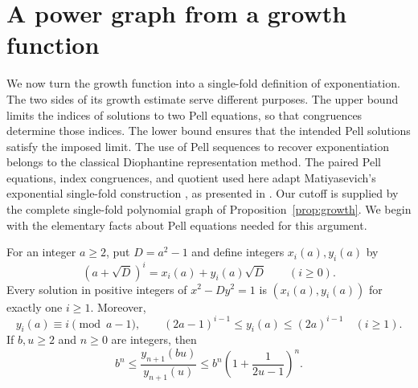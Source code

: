 \section{A power graph from a growth function}\label{sec:power}

We now turn the growth function into a single-fold definition of
exponentiation.  The two sides of its growth estimate serve different
purposes.  The upper bound limits the indices of solutions to two Pell
equations, so that congruences determine those indices.  The lower bound
ensures that the intended Pell solutions satisfy the imposed limit.
The use of Pell sequences to recover exponentiation belongs to the
classical Diophantine representation method.  The paired Pell equations,
index congruences, and quotient used here adapt Matiyasevich's exponential
single-fold construction \cite[Section~4]{mati1974}, as presented in
\cite[Section~6, Lemma~6.1 and Theorem~5]{cco2024}.
Our cutoff is supplied by the complete
single-fold polynomial graph of Proposition~\ref{prop:growth}.
We begin with the elementary facts about Pell equations needed for this
argument.

\begin{lemma}\label{lem:pell-sequences}
For an integer $a\ge2$, put $D=a^2-1$ and define integers
$x_i(a),y_i(a)$ by
\[
 (a+\sqrt D)^i=x_i(a)+y_i(a)\sqrt D\qquad(i\ge0).
\]
Every solution in positive integers of $x^2-Dy^2=1$ is
$(x_i(a),y_i(a))$ for exactly one $i\ge1$.  Moreover,
\begin{equation}\label{eq:pell-bounds}
 y_i(a)\equiv i\pmod{a-1},\qquad
 (2a-1)^{i-1}\le y_i(a)\le(2a)^{i-1}\quad(i\ge1).
\end{equation}
If $b,u\ge2$ and $n\ge0$ are integers, then
\begin{equation}\label{eq:pell-ratio}
 b^n\le \frac{y_{n+1}(bu)}{y_{n+1}(u)}
 \le b^n\left(1+\frac1{2u-1}\right)^n.
\end{equation}
\end{lemma}


